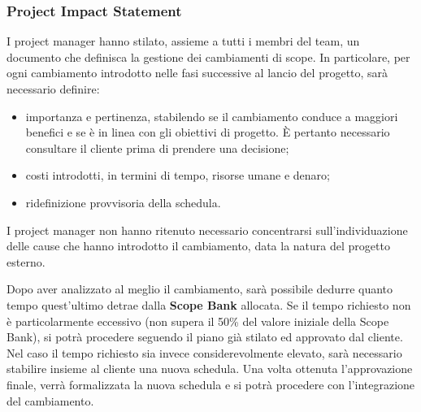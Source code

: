 \subsubsection{Project Impact Statement}
\label{sec:impact}
I project manager hanno stilato, assieme a tutti i membri del team, un documento che definisca la gestione dei cambiamenti di scope. In particolare, per ogni cambiamento introdotto nelle fasi successive al lancio del progetto, sarà necessario definire:
\begin{itemize}
    \item importanza e pertinenza, stabilendo se il cambiamento conduce a maggiori benefici e se è in linea con gli obiettivi di progetto. È pertanto necessario consultare il cliente prima di prendere una decisione;
    \item costi introdotti, in termini di tempo, risorse umane e denaro;
    \item ridefinizione provvisoria della schedula.
\end{itemize}
I project manager non hanno ritenuto necessario concentrarsi sull'individuazione delle cause che hanno introdotto il cambiamento, data la natura del progetto esterno.

Dopo aver analizzato al meglio il cambiamento, sarà possibile dedurre quanto tempo quest'ultimo detrae dalla \textbf{Scope Bank} allocata. Se il tempo richiesto non è particolarmente eccessivo (non supera il 50\% del valore iniziale della Scope Bank), si potrà procedere seguendo il piano già stilato ed approvato dal cliente.
Nel caso il tempo richiesto sia invece considerevolmente elevato, sarà necessario stabilire insieme al cliente una nuova schedula. Una volta ottenuta l'approvazione finale, verrà formalizzata la nuova schedula e si potrà procedere con l'integrazione del cambiamento.